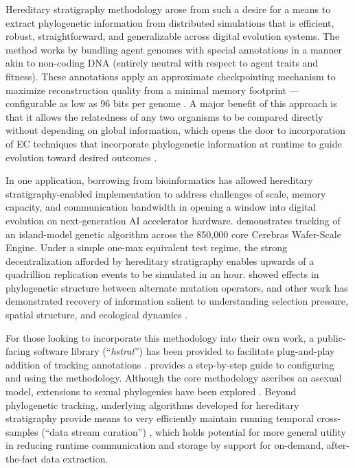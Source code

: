 Hereditary stratigraphy methodology arose from such a desire for a means to extract phylogenetic information from distributed simulations that is efficient, robust, straightforward, and generalizable across digital evolution systems.
The method works by bundling agent genomes with special annotations in a manner akin to non-coding DNA (entirely neutral with respect to agent traits and fitness).
These annotations apply an approximate checkpointing mechanism to maximize reconstruction quality from a minimal memory footprint --- configurable as low as 96 bits per genome \citep{moreno2022hereditary}.
A major benefit of this approach is that it allows the relatedness of any two organisms to be compared directly without depending on global information, which opens the door to incorporation of EC techniques that incorporate phylogenetic information at runtime to guide evolution toward desired outcomes \citep{lalejini2024phylogeny,lalejini2024runtime,murphy2008simple,burke2003increased}.

In one application, borrowing from bioinformatics has allowed hereditary stratigraphy-enabled implementation to address challenges of scale, memory capacity, and communication bandwidth in opening a window into digital evolution on next-generation AI accelerator hardware.
\citet{moreno2024trackable} demonstrates tracking of an island-model genetic algorithm across the 850,000 core Cerebras Wafer-Scale Engine.
Under a simple one-max equivalent test regime, the strong decentralization afforded by hereditary stratigraphy enables upwards of a quadrillion replication events to be simulated in an hour.
\citet{moreno2024trackable} showed effects in phylogenetic structure between alternate mutation operators, and other work has demonstrated recovery of information salient to understanding selection pressure, spatial structure, and ecological dynamics \citep{moreno2024ecology}.

For those looking to incorporate this methodology into their own work, a public-facing software library (``\textit{hstrat}'') has been provided to facilitate plug-and-play addition of tracking annotations  \citep{moreno2022hstrat}.
\citet{moreno2024guide} provides a step-by-step guide to configuring and using the methodology.
Although the core methodology ascribes an asexual model, extensions to sexual phylogenies have been explored \citep{moreno2024methods}.
Beyond phylogenetic tracking, underlying algorithms developed for hereditary stratigraphy provide means to very efficiently maintain running temporal cross-samples (``data stream curation'') \citep{moreno2024structured}, which holds potential for more general utility in reducing runtime communication and storage by support for on-demand, after-the-fact data extraction.

